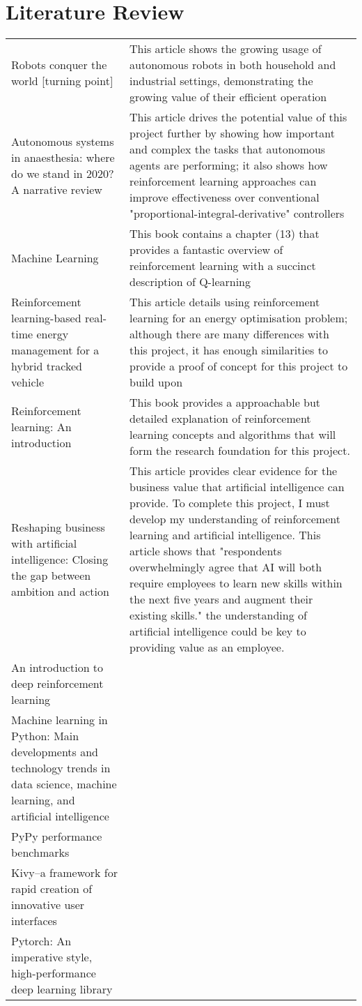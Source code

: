 \documentclass[]{final_report}
\begin{document}
\chapter{Literature Review}

\renewcommand{\arraystretch}{1.5}
\begin{xltabular}{\textwidth}{p{6cm} X}
  Robots conquer the world [turning point]\cite{hagele2016robots} & This article shows the growing usage of autonomous robots in both household and industrial settings, demonstrating the growing value of their efficient operation \\
  Autonomous systems in anaesthesia: where do we stand in 2020? A narrative review\cite{zaouter2020autonomous} & This article drives the potential value of this project further by showing how important and complex the tasks that autonomous agents are performing; it also shows how reinforcement learning approaches can improve effectiveness over conventional "proportional-integral-derivative" controllers \\
  Machine Learning\cite{mitchell1997machine} & This book contains a chapter (13) that provides a fantastic overview of reinforcement learning with a succinct description of Q-learning \\
Reinforcement learning-based real-time energy management for a hybrid tracked vehicle\cite{ZOU2016372} & This article details using reinforcement learning for an energy optimisation problem; although there are many differences with this project, it has enough similarities to provide a proof of concept for this project to build upon \\
Reinforcement learning: An introduction\cite{sutton2018reinforcement} & This book provides a
approachable but detailed explanation of reinforcement learning concepts and algorithms that will form the research foundation for this project. \\
Reshaping business with artificial intelligence: Closing the gap between ambition and action\cite{ransbotham2017reshaping} & This article provides clear evidence for the business value that artificial intelligence can provide. To complete this project, I must develop my understanding of reinforcement learning and artificial intelligence. This article shows that "respondents overwhelmingly agree that AI will both require employees to learn new skills within the next five years and augment their existing skills." the understanding of artificial intelligence could be key to providing value as an employee.   \\
An introduction to deep reinforcement learning\cite{franccois2018introduction} & \\
Machine learning in Python: Main developments and technology trends in data science, machine learning, and artificial intelligence\cite{raschka2020machine} & \\
PyPy performance benchmarks\cite{pypy2023benchmarks} & \\
Kivy--a framework for rapid creation of innovative user interfaces\cite{virbel2011kivy} & \\
Pytorch: An imperative style, high-performance deep learning library\cite{paszke2019pytorch} & \\
\end{xltabular}
\end{document}
